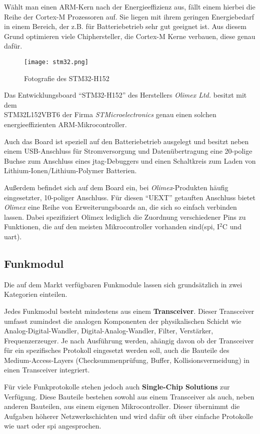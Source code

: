 Wählt man einen ARM-Kern nach der Energieeffizienz aus, fällt einem hierbei die
Reihe der Cortex-M Prozessoren auf. Sie liegen mit ihrem geringen Energiebedarf
in einem Bereich, der z.B. für Batteriebetrieb sehr gut geeignet ist. Aus diesem
Grund optimieren viele Chiphersteller, die Cortex-M Kerne verbauen, diese genau
dafür.

\begin{figure}[!ht]
\centering
\texttt{[image: stm32.png]}\\
\caption{Fotografie des STM32-H152}{}
\end{figure}

Das Entwicklungsboard "`STM32-H152"'\cite{OLI2} des Herstellers
\emph{Olimex Ltd.} besitzt mit dem \\STM32L152VBT6 der Firma
\emph{STMicroelectronics} genau einen solchen
energieeffizienten ARM-Mikrocontroller.

Auch das Board ist speziell auf den Batteriebetrieb ausgelegt und besitzt neben
einem USB-Anschluss für Stromversorgung und Datenübertragung eine 20-polige Buchse zum
Anschluss eines \gls{jtag}-Debuggers und einen Schaltkreis zum Laden von
Lithium-Ionen/Lithium-Polymer Batterien.

Außerdem befindet sich auf dem Board ein, bei \emph{Olimex}-Produkten häufig
eingesetzter, 10-poliger Anschluss. Für diesen "`UEXT"' getauften Anschluss
bietet \emph{Olimex} eine Reihe von Erweiterungsboards an, die sich so einfach
verbinden lassen. Dabei spezifiziert Olimex lediglich die Zuordnung
verschiedener Pins zu Funktionen, die auf den meisten Mikrocontroller
vorhanden sind(\gls{spi}, I$^2$C und \gls{uart}).

\subsection{Funkmodul} Die auf dem Markt verfügbaren Funkmodule lassen
sich grundsätzlich in zwei Kategorien einteilen.

Jedes Funkmodul besteht mindestens aus einem \textbf{Transceiver}. Dieser
Transceiver umfasst zumindest die analogen Komponenten der physikalischen
Schicht wie Analog-Digital-Wandler, Digital-Analog-Wandler, Filter, Verstärker,
Frequenzerzeuger. Je nach Ausführung werden, ahängig davon ob der Transceiver
für ein spezifisches Protokoll eingesetzt werden soll, auch die Bauteile des
Medium-Access-Layers (Checksummenprüfung, Buffer, Kollisionsvermeidung) in
einen Transceiver integriert.

Für viele Funkprotokolle stehen jedoch auch \textbf{Single-Chip Solutions}
zur Verfügung. Diese Bauteile bestehen sowohl aus einem Transceiver als auch,
neben anderen Bauteilen, aus einem eigenen Mikrocontroller. Dieser übernimmt die
Aufgaben höherer Netzwerkschichten und wird dafür oft über einfache Protokolle
wie \gls{uart} oder \gls{spi} angesprochen.

